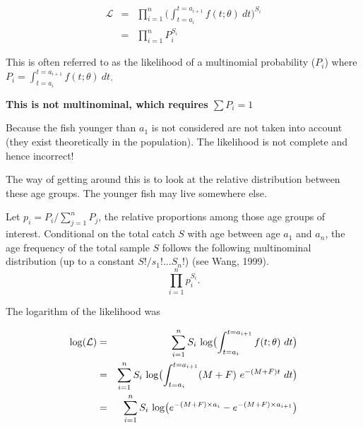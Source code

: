 \begin{eqnarray}
\mathcal{L}  &=& \prod_{i=1}^{n} \bigl ( \int_{t=a_{i}}^{t=a_{i+1}} f(t; \theta) \ dt \bigr ) ^ {S_{i}} \\
            &=& \prod_{i=1}^{n} P_{i} ^ {S_{i}}
\end{eqnarray}

This is often referred to as the likelihood of a multinomial probability ($P_{i}$) where $P_{i}=\int_{t=a_{i}}^{t=a_{i+1}} f(t; \theta) \ dt$.

{\bf  This is not multinominal,  which requires $\sum P_i = 1$

Because the fish younger than $a_1$ is not considered are not taken into account (they exist theoretically in the population). The likelihood is not complete and hence incorrect!
}

The way of getting around this is to look at the relative distribution between these age groups. The younger fish may live somewhere else.

Let $p_i=P_i/\sum_{j=1}^n P_j$, the relative proportions among those age groups of interest.
Conditional on the total catch $S$ with age between age $a_1$ and $a_n$, the age frequency of the total sample $S$ follows the following multinominal distribution (up to a constant $S!/s_1!...S_n!$) (see Wang, 1999).
$$
 \prod_{i=1}^{n} p_{i} ^ {S_{i}}.
$$


The logarithm of the likelihood was

\begin{eqnarray}
{\rm log}(\mathcal{L}) &=& \sum_{i=1}^{n} S_{i} \ {\rm log} \bigl ( \int_{t=a_{i}}^{t=a_{i+1}} f(t; \theta) \ dt \bigr ) \\
                       &=& \sum_{i=1}^{n} S_{i} \ {\rm log} \bigl ( \int_{t=a_{i}}^{t=a_{i+1}} (M + F) \ e^{-(M+F)t} \ dt \bigr ) \\
                       &=& \sum_{i=1}^{n} S_{i} \ {\rm log} \bigl ( e^{-(M+F) \times a_{i}} - e^{-(M+F) \times a_{i+1}} \bigr ) \\
\end{eqnarray}


